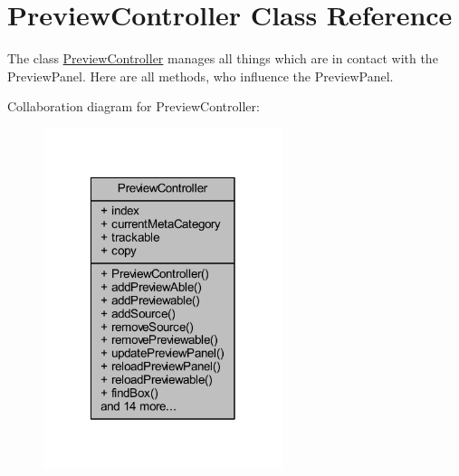\hypertarget{class_preview_controller}{\section{Preview\-Controller Class Reference}
\label{class_preview_controller}
}


The class \hyperlink{class_preview_controller}{Preview\-Controller} manages all things which are in contact with the Preview\-Panel. Here are all methods, who influence the Preview\-Panel.  




Collaboration diagram for Preview\-Controller\-:
\nopagebreak
\begin{figure}[H]
\begin{center}
\leavevmode
\includegraphics[width=198pt]{class_preview_controller__coll__graph}
\end{center}
\end{figure}
